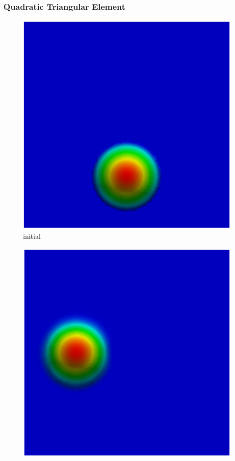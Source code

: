 
\begin{frame} 
 \frametitle{\normalsize Quadratic Triangular Element}
\vspace{-1.0cm}
\begin{center}
\begin{figure}[H]
     \centering
     \begin{minipage}{.5\linewidth}
      \centering
      \includegraphics[scale=0.22]{./images/figSLquad0.png}\\
      \tiny initial 
     \end{minipage}%
     \begin{minipage}{.5\linewidth}
      \centering
      \includegraphics[scale=0.22]{./images/figSLquad1.png}\\

\end{minipage}
\end{figure}
\end{center}
\end{frame}
